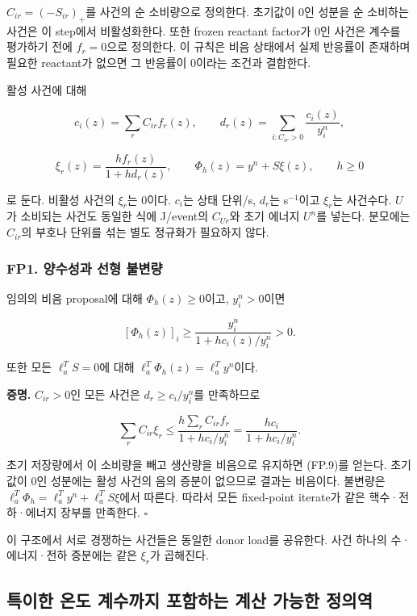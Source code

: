 \(C_{ir}=(-S_{ir})_+\)를 사건의 순 소비량으로 정의한다. 초기값이 0인 성분을 순 소비하는 사건은 이 step에서 비활성화한다. 또한 frozen reactant factor가 0인 사건은 계수를 평가하기 전에 \(f_r=0\)으로 정의한다. 이 규칙은 비음 상태에서 실제 반응률이 존재하며 필요한 reactant가 없으면 그 반응률이 0이라는 조건과 결합한다.

활성 사건에 대해

\[
c_i(z)=\sum_r C_{ir}f_r(z),\qquad
d_r(z)=\sum_{i:C_{ir}>0}\frac{c_i(z)}{y_i^n},
\tag{FP.7}
\]

\[
\xi_r(z)=\frac{h f_r(z)}{1+h d_r(z)},\qquad
\boxed{\Phi_h(z)=y^n+S\xi(z)},\qquad h\ge0
\tag{FP.8}
\]

로 둔다. 비활성 사건의 \(\xi_r\)는 0이다. \(c_i\)는 상태 단위/s, \(d_r\)는 s\(^{-1}\)이고 \(\xi_r\)는 사건수다. \(U\)가 소비되는 사건도 동일한 식에 J/event의 \(C_{Ur}\)와 초기 에너지 \(U^n\)를 넣는다. 분모에는 \(C_{ir}\)의 부호나 단위를 섞는 별도 정규화가 필요하지 않다.

\hypertarget{fp1.-uxc591uxc218uxc131uxacfc-uxc120uxd615-uxbd88uxbcc0uxb7c9}{%
\subsubsection{FP1. 양수성과 선형 불변량}\label{fp1.-uxc591uxc218uxc131uxacfc-uxc120uxd615-uxbd88uxbcc0uxb7c9}}

임의의 비음 proposal에 대해 \(\Phi_h(z)\ge0\)이고, \(y_i^n>0\)이면

\[
\boxed{
[\Phi_h(z)]_i
\ge
\frac{y_i^n}{1+h c_i(z)/y_i^n}>0.
}
\tag{FP.9}
\]

또한 모든 \(\ell_a^TS=0\)에 대해 \(\ell_a^T\Phi_h(z)=\ell_a^Ty^n\)이다.

\textbf{증명.} \(C_{ir}>0\)인 모든 사건은 \(d_r\ge c_i/y_i^n\)를 만족하므로

\[
\sum_r C_{ir}\xi_r
\le
\frac{h\sum_r C_{ir}f_r}{1+h c_i/y_i^n}
=
\frac{h c_i}{1+h c_i/y_i^n}.
\]

초기 저장량에서 이 소비량을 빼고 생산량을 비음으로 유지하면 (FP.9)를 얻는다. 초기값이 0인 성분에는 활성 사건의 음의 증분이 없으므로 결과는 비음이다. 불변량은 \(\ell_a^T\Phi_h=\ell_a^Ty^n+\ell_a^TS\xi\)에서 따른다. 따라서 모든 fixed-point iterate가 같은 핵수·전하·에너지 장부를 만족한다. \(\square\)

이 구조에서 서로 경쟁하는 사건들은 동일한 donor load를 공유한다. 사건 하나의 수·에너지·전하 증분에는 같은 \(\xi_r\)가 곱해진다.

\hypertarget{uxd2b9uxc774uxd55c-uxc628uxb3c4-uxacc4uxc218uxae4cuxc9c0-uxd3ecuxd568uxd558uxb294-uxacc4uxc0b0-uxac00uxb2a5uxd55c-uxc815uxc758uxc5ed}{%
\subsection{특이한 온도 계수까지 포함하는 계산 가능한 정의역}\label{uxd2b9uxc774uxd55c-uxc628uxb3c4-uxacc4uxc218uxae4cuxc9c0-uxd3ecuxd568uxd558uxb294-uxacc4uxc0b0-uxac00uxb2a5uxd55c-uxc815uxc758uxc5ed}}

